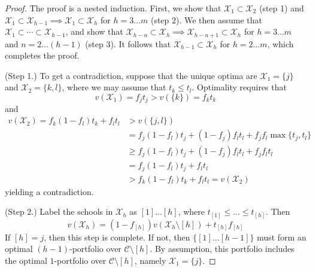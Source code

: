 \documentclass[12pt]{article} %
\DeclareMathOperator*{\argmax}{arg\,max}
\theoremstyle{definition}
\theoremstyle{definition}
\begin{document}
\begin{proof}
The proof is a nested induction. First, we show that $\mathcal{X}_1 \subset \mathcal{X}_2$ (step 1) and $\mathcal{X}_1 \subset \mathcal{X}_{h-1} \implies \mathcal{X}_1 \subset \mathcal{X}_{h}$ for $h = 3 \dots m$ (step 2). We then assume that $\mathcal{X}_1 \subset \cdots \subset \mathcal{X}_{h-1}$, and show that $\mathcal{X}_{h-n} \subset \mathcal{X}_h \implies \mathcal{X}_{h-n+1} \subset \mathcal{X}_h $ for $h=3\dots m$ and $n = 2 \dots (h-1)$ (step 3). It follows that $\mathcal{X}_{h-1} \subset \mathcal{X}_h$ for $h = 2 \dots m$, which completes the proof.

(Step 1.) To get a contradiction, suppose that the unique optima are $\mathcal{X}_1 = \{j\}$ and $\mathcal{X}_2 = \{k, l\}$, where we may assume that $t_k \leq t_l$. Optimality requires that
\begin{equation}v(\mathcal{X}_1 )  = f_j t_j > v(\{k\}) = f_k t_k\end{equation}
and
\begin{align}
v(\mathcal{X}_2) =  f_k (1- f_l) t_k + f_l t_l &> v(\{j, l\}) \\
& = f_j (1- f_l) t_j + (1- f_j) f_l t_l + f_j f_l \max\{t_j, t_l\} \\
&\geq  f_j (1- f_l) t_j + (1- f_j) f_l t_l + f_j f_l  t_l \\
&= f_j (1- f_l) t_j + f_l t_l  \\
&> f_k (1- f_l) t_k + f_l t_l  = v(\mathcal{X}_2)
\end{align}
yielding a contradiction.



(Step 2.) Label the schools in $\mathcal{X}_h$ as $[1] \dots [h]$, where $t_{[1]} \leq \dots \leq t_{[h]}$. Then
\begin{equation}
v(\mathcal{X}_h) = ( 1 - f_{[h]}) v(\mathcal{X}_h \setminus [h]) + t_{[h]} f_{[h]}
\end{equation}
If $[h] = j$, then this step is complete. If not, then $\{[1]\dots  [h-1]\}$ must form an optimal $(h-1)$-portfolio over $\mathcal{C}\setminus [h]$. By assumption, this portfolio includes the optimal $1$-portfolio over $\mathcal{C}\setminus [h]$, namely $\mathcal{X}_1 = \{j\}$. 


\end{proof}
\end{document}
